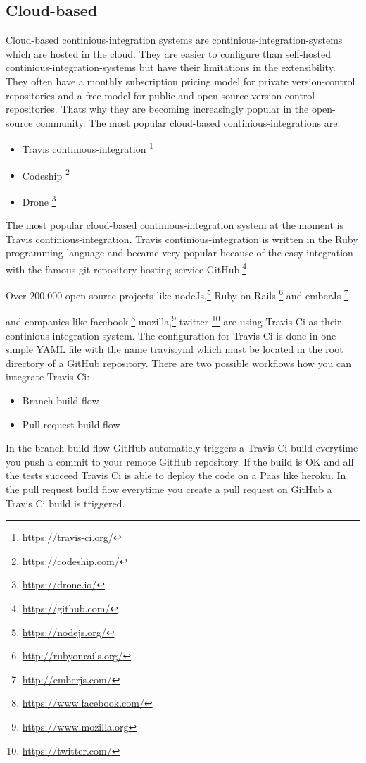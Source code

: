 \subsection{Cloud-based}\label{sec:tooling-cloud-based}

Cloud-based continious-integration systems are continious-integration-systems which are hosted in the cloud.
They are easier to configure than self-hosted continious-integration-systems but have their limitations in the extensibility.
They often have a monthly subscription pricing model for private version-control repositories 
and a free model for public and open-source version-control repositories.
Thats why they are becoming increasingly popular in the open-source community.
The most popular cloud-based continious-integrations are:
\begin{itemize} 
    \item Travis continious-integration \footnote{\url{https://travis-ci.org/}}

    \item Codeship \footnote{\url{https://codeship.com/}}

    \item Drone \footnote{\url{https://drone.io/}}

\end{itemize}
The most popular cloud-based continious-integration system at the moment is Travis continious-integration.
Travis continious-integration is written in the Ruby programming language and became very popular because of the easy integration with the famous git-repository hosting service GitHub.\footnote{\url{https://github.com/}}

Over 200.000 open-source projects like nodeJs,\footnote{\url{https://nodejs.org/}}
 Ruby on Rails \footnote{\url{http://rubyonrails.org/}}
and emberJs \footnote{\url{http://emberjs.com/}}

and companies like facebook,\footnote{\url{https://www.facebook.com/}}
 mozilla,\footnote{\url{https://www.mozilla.org}}
 twitter \footnote{\url{https://twitter.com/}}
are using Travis Ci as their continious-integration system.
The configuration for Travis Ci is done in one simple YAML file with the name travis.yml 
which must be located in the root directory of a GitHub repository.
There are two possible workflows how you can integrate Travis Ci:
\begin{itemize} 
    \item Branch build flow
    \item Pull request build flow
\end{itemize}
In the branch build flow GitHub automaticly triggers a Travis Ci build everytime you push a commit to your remote GitHub repository.
If the build is OK and all the tests succeed Travis Ci is able to deploy the code on a Paas like heroku.
In the pull request build flow everytime you create a pull request on GitHub a Travis Ci build is triggered.

